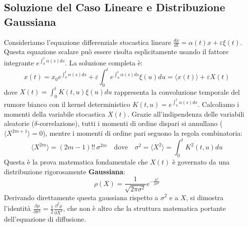 \documentclass[12pt,a4paper]{article}
\begin{document}
\subsection{Soluzione del Caso Lineare e Distribuzione Gaussiana}
Consideriamo l'equazione differenziale stocastica lineare $\frac{dx}{dt} = \alpha(t)x + \varepsilon \xi(t)$. Questa equazione scalare può essere risolta esplicitamente usando il fattore integrante $e^{\int_0^t \alpha(s)ds}$. La soluzione completa è:
\begin{equation}
x(t) = x_0 e^{\int_0^t \alpha(s)ds} + \varepsilon \int_0^t e^{\int_u^t \alpha(s)ds} \xi(u) du = \langle x(t) \rangle + \varepsilon X(t)
\end{equation}
dove $X(t) = \int_0^t K(t,u)\xi(u)du$ rappresenta la convoluzione temporale del rumore bianco con il kernel deterministico $K(t,u) = e^{\int_u^t \alpha(s)ds}$.
Calcoliamo i momenti della variabile stocastica $X(t)$. Grazie all'indipendenza delle variabili aleatorie ($\delta$-correlazione), tutti i momenti di ordine dispari si annullano ($\langle X^{2m+1} \rangle = 0$), mentre i momenti di ordine pari seguono la regola combinatoria:
\begin{equation}
\langle X^{2m} \rangle = (2m-1)!! \, \sigma^{2m} \quad \text{dove} \quad \sigma^2 = \langle X^2 \rangle = \int_0^t K^2(t,u)du
\end{equation}
Questa è la prova matematica fondamentale che $X(t)$ è governato da una distribuzione rigorosamente \textbf{Gaussiana}:
\begin{equation}
\rho(X) = \frac{1}{\sqrt{2\pi\sigma^2}} e^{-\frac{X^2}{2\sigma^2}}
\end{equation}
Derivando direttamente questa gaussiana rispetto a $\sigma^2$ e a $X$, si dimostra l'identità $\frac{\partial \rho}{\partial \sigma^2} = \frac{1}{2} \frac{\partial^2 \rho}{\partial X^2}$, che non è altro che la struttura matematica portante dell'equazione di diffusione.
\end{document}
